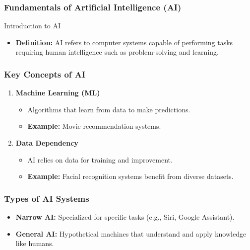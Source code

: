 \documentclass[aspectratio=169]{beamer}
\begin{document}
\begin{frame}[fragile]
    \frametitle{Fundamentals of Artificial Intelligence (AI)}
    \begin{block}{Introduction to AI}
        \begin{itemize}
            \item \textbf{Definition:} AI refers to computer systems capable of performing tasks requiring human intelligence such as problem-solving and learning.
        \end{itemize}
    \end{block}
\end{frame}

\begin{frame}[fragile]
    \frametitle{Key Concepts of AI}
    \begin{enumerate}
        \item \textbf{Machine Learning (ML)}
            \begin{itemize}
                \item Algorithms that learn from data to make predictions.
                \item \textbf{Example:} Movie recommendation systems.
            \end{itemize}
        \item \textbf{Data Dependency}
            \begin{itemize}
                \item AI relies on data for training and improvement.
                \item \textbf{Example:} Facial recognition systems benefit from diverse datasets.
            \end{itemize}
    \end{enumerate}
\end{frame}

\begin{frame}[fragile]
    \frametitle{Types of AI Systems}
    \begin{itemize}
        \item \textbf{Narrow AI:} Specialized for specific tasks (e.g., Siri, Google Assistant).
        \item \textbf{General AI:} Hypothetical machines that understand and apply knowledge like humans.
    \end{itemize}
\end{frame}
\end{document}
